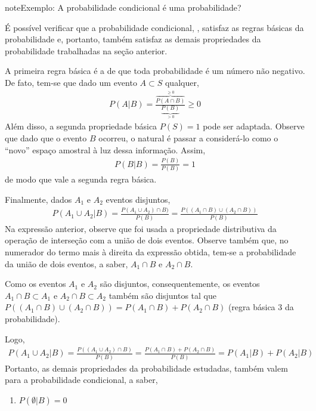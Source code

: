 \begin{sphinxadmonition}{note}{Exemplo: A probabilidade condicional é uma probabilidade?}

É possível verificar que a probabilidade condicional, , satisfaz as regras básicas da probabilidade e, portanto, também satisfaz as demais propriedades da probabilidade trabalhadas na seção anterior.

A primeira regra básica é a de que toda probabilidade é um número não negativo. De fato, tem-se que dado um evento \(A\subset S\) qualquer,
\begin{equation*}
\begin{split}P(A|B)=\frac{\overbrace{P(A\cap B)}^{\geq 0}}{\underbrace{P(B)}_{>0}}\geq 0\end{split}
\end{equation*}
Além disso, a segunda propriedade básica \(P(S)=1\) pode ser adaptada.  Observe que dado que o evento \(B\) ocorreu, o natural é passar a considerá-lo como o “novo” espaço amostral à luz dessa informação. Assim,
\begin{equation*}
\begin{split}P(B|B)=\frac{P(B)}{P(B)}=1\end{split}
\end{equation*}
de modo que vale a segunda regra básica.

Finalmente, dados \(A_1\) e \(A_2\)  eventos disjuntos,
\begin{equation*}
\begin{split}P(A_1\cup A_2|B)=\frac{P(A_1\cup A_2)\cap B)}{P(B)}=\frac{P((A_1\cap B)\cup(A_2\cap B))}{P(B)}\end{split}
\end{equation*}
Na expressão anterior, observe que foi usada a propriedade distributiva da operação de interseção com a união de dois eventos. Observe também que, no numerador do termo mais à direita da expressão obtida, tem-se a probabilidade da união de dois eventos, a saber, \(A_1\cap B\) e \(A_2\cap B\).

Como os eventos \(A_1\) e \(A_2\) são disjuntos, consequentemente, os eventos \(A_1\cap B\subset A_1\) e \(A_2\cap B\subset A_2\)  também são disjuntos tal que \(P((A_1\cap B)\cup(A_2\cap B))=P(A_1\cap B)+P(A_2\cap B)\) (regra básica 3 da probabilidade).

Logo,
\begin{equation*}
\begin{split}P(A_1\cup A_2|B)=\frac{P((A_1\cup A_2)\cap B)}{P(B)}=\frac{P(A_1\cap B)+P(A_2\cap B)}{P(B)}=P(A_1|B)+P(A_2|B)\end{split}
\end{equation*}
Portanto, as demais propriedades da probabilidade estudadas, também valem para a probabilidade condicional, a saber,
\begin{enumerate}
\item {} 
\(P(\emptyset |B)=0\)


\end{enumerate}
\end{sphinxadmonition}
